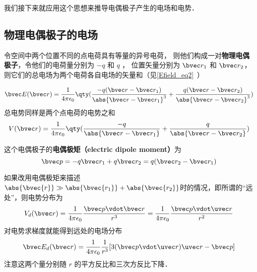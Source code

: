 我们接下来就应用这个思想来推导电偶极子产生的电场和电势．


\subsection{物理电偶极子的电场}

令空间中两个位置不同的点电荷具有等量的异号电荷， 则他们构成一对\textbf{物理电偶极子}，令他们的电荷量分别为 $-q$ 和 $q$ ， 位置矢量分别为 $\bvec r_1$ 和 $\bvec r_2$， 则它们的总电场为两个电荷各自电场的矢量和（见\autoref{Efield_eq2}~）

\begin{equation}
\bvec E(\bvec r) = \frac{1}{4\pi\epsilon_0} \qty(\frac{-q(\bvec r - \bvec r_1)}{\abs{\bvec r - \bvec r_1}^3} + \frac{q(\bvec r - \bvec r_2)}{\abs{\bvec r - \bvec r_2}^3})
\end{equation}
总电势同样是两个点电荷的电势之和%
\begin{equation}
V(\bvec r) = \frac{1}{4\pi\epsilon_0} \qty(\frac{-q}{\abs{\bvec r - \bvec r_1}} + \frac{q}{\abs{\bvec r - \bvec r_2}})
\end{equation}


这个电偶极子的\textbf{电偶极矩（electric dipole moment）}为
\begin{equation}\label{eleDpl_eq1}
\bvec p = -q \bvec r_1 + q \bvec r_2 = q (\bvec r_2 - \bvec r_1)
\end{equation} 

如果改用电偶极矩来描述$\abs{\bvec{r}}\gg\\\abs{\bvec{r_1}}+\abs{\bvec{r_2}}$时的情况，即所谓的“远处”，则电势分布为
\begin{equation}\label{eleDpl_eq2}
V_d(\bvec r) = \frac{1}{4\pi\epsilon_0} \frac{\bvec p\vdot \bvec r}{r^3} = \frac{1}{4\pi\epsilon_0} \frac{\bvec p \vdot \uvec r}{r^2}
\end{equation}
对电势求梯度就能得到远处的电场分布
\begin{equation}\label{eleDpl_eq3}
\bvec E_d(\bvec r) = \frac{1}{4\pi\epsilon_0} \frac{1}{r^3} [3(\bvec p \vdot \uvec r) \uvec r - \bvec p]
\end{equation}
注意这两个量分别随 $r$ 的平方反比和三次方反比下降．

